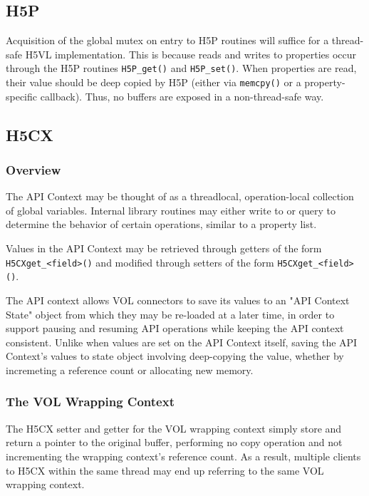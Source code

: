 \documentclass{article}
\begin{document}
\subsection{H5P}

Acquisition of the global mutex on entry to H5P routines will suffice for a thread-safe H5VL implementation. This is because reads and writes to properties occur through the H5P routines \texttt{H5P\_get()} and \texttt{H5P\_set()}. When properties are read, their value should be deep copied by H5P (either via \texttt{memcpy()} or a property-specific callback). Thus, no buffers are exposed in a non-thread-safe way. 

\subsection{H5CX}
\label{sec:dependencies-h5cx}

\subsubsection{Overview}

The API Context may be thought of as a threadlocal, operation-local collection of global variables. Internal library routines may either write to or query to determine the behavior of certain operations, similar to a property list.

Values in the API Context may be retrieved through getters of the form \texttt{H5CXget\_<field>()} and modified through setters of the form \texttt{H5CXget\_<field>()}.

The API context allows VOL connectors to save its values to an "API Context State" object from which they may be re-loaded at a later time, in order to support pausing and resuming API operations while keeping the API context consistent. Unlike when values are set on the API Context itself, saving the API Context's values to state object involving deep-copying the value, whether by incremeting a reference count or allocating new memory.

\subsubsection{The VOL Wrapping Context}

The H5CX setter and getter for the VOL wrapping context simply store and return a pointer to the original buffer, performing no copy operation and not incrementing the wrapping context's reference count. As a result, multiple clients to H5CX within the same thread may end up referring to the same VOL wrapping context. 
\end{document}
